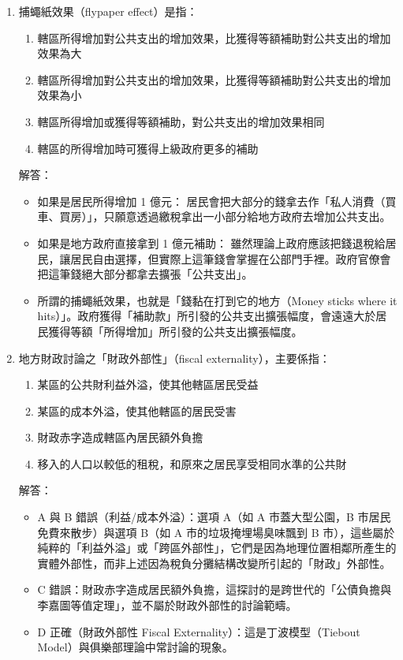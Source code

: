 \documentclass[12pt, a4paper]{article}
\begin{document}
\begin{enumerate}
    \item 捕蠅紙效果（flypaper effect）是指：
    \begin{enumerate}[label=\Alph*.]
        \item 轄區所得增加對公共支出的增加效果，比獲得等額補助對公共支出的增加效果為大
        \item 轄區所得增加對公共支出的增加效果，比獲得等額補助對公共支出的增加效果為小
        \item 轄區所得增加或獲得等額補助，對公共支出的增加效果相同
        \item 轄區的所得增加時可獲得上級政府更多的補助
    \end{enumerate}
    解答：
    \begin{itemize}
        \item 如果是居民所得增加 1 億元： 居民會把大部分的錢拿去作「私人消費（買車、買房）」，只願意透過繳稅拿出一小部分給地方政府去增加公共支出。
        \item 如果是地方政府直接拿到 1 億元補助： 雖然理論上政府應該把錢退稅給居民，讓居民自由選擇，但實際上這筆錢會掌握在公部門手裡。政府官僚會把這筆錢絕大部分都拿去擴張「公共支出」。
        \item 所謂的捕蠅紙效果，也就是「錢黏在打到它的地方（Money sticks where it hits）」。政府獲得「補助款」所引發的公共支出擴張幅度，會遠遠大於居民獲得等額「所得增加」所引發的公共支出擴張幅度。
    \end{itemize}

    \item 地方財政討論之「財政外部性」（fiscal externality），主要係指：
    \begin{enumerate}[label=\Alph*.]
        \item 某區的公共財利益外溢，使其他轄區居民受益
        \item 某區的成本外溢，使其他轄區的居民受害
        \item 財政赤字造成轄區內居民額外負擔
        \item 移入的人口以較低的租稅，和原來之居民享受相同水準的公共財
    \end{enumerate}
    解答：
    \begin{itemize}
        \item A 與 B 錯誤（利益/成本外溢）：選項 A（如 A 市蓋大型公園，B 市居民免費來散步）與選項 B（如 A 市的垃圾掩埋場臭味飄到 B 市），這些屬於純粹的「利益外溢」或「跨區外部性」，它們是因為地理位置相鄰所產生的實體外部性，而非上述因為稅負分攤結構改變所引起的「財政」外部性。
        \item C 錯誤：財政赤字造成居民額外負擔，這探討的是跨世代的「公債負擔與李嘉圖等值定理」，並不屬於財政外部性的討論範疇。
        \item D 正確（財政外部性 Fiscal Externality）：這是丁波模型（Tiebout Model）與俱樂部理論中常討論的現象。


\end{itemize}
\end{enumerate}
\end{document}
